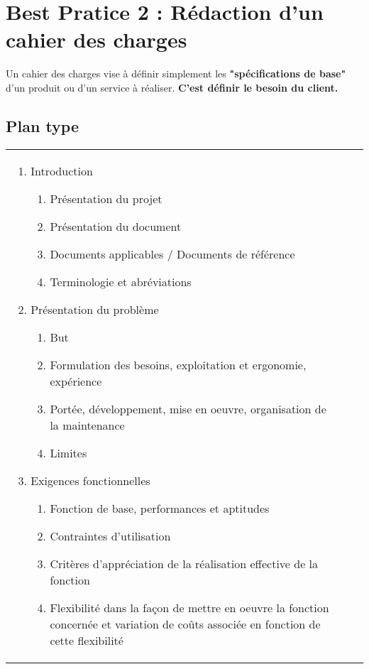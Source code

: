 \section{Best Pratice 2 : Rédaction d'un cahier des charges}

Un cahier des charges vise à définir simplement les \textbf{"spécifications de base"} d’un produit ou d’un service à réaliser.
\textbf{C'est définir le besoin du client.}
\subsection{Plan type}
\begin{tabular}{p{} p{0.5cm} p{}}
 \small{
    \begin{enumerate}
      \item  Introduction
        \begin{enumerate}
          \item Présentation du projet
          \item Présentation du document 
          \item Documents applicables / Documents de référence
          \item Terminologie et abréviations
        \end{enumerate}  
      \item  Présentation du problème
        \begin{enumerate}
          \item But
          \item Formulation des besoins, exploitation et ergonomie, expérience 
          \item Portée, développement, mise en oeuvre, organisation de la maintenance
          \item Limites
        \end{enumerate} 
      \item  Exigences fonctionnelles
        \begin{enumerate}
          \item Fonction de base, performances et aptitudes
          \item Contraintes d'utilisation 
          \item Critères d'appréciation de la réalisation effective de la fonction
          \item Flexibilité dans la façon de mettre en oeuvre la fonction concernée et variation de coûts associée en fonction de cette flexibilité
        \end{enumerate} 

\end{enumerate}}
\end{tabular}
